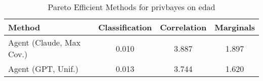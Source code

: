 \begin{table}[t!]
    \centering
    \caption{Pareto Efficient Methods for privbayes on edad}
    \label{tab:pareto_efficient_methods_privbayes_edad}
    \begin{tabular}{lccc}
    \toprule
    Method & Classification & Correlation & Marginals \\
    \midrule
    Agent (Claude, Max Cov.) & \cellcolor{gold!30}0.010 & \cellcolor{silver!30}3.887 & \cellcolor{silver!30}1.897 \\
    Agent (GPT, Unif.) & \cellcolor{silver!30}0.013 & \cellcolor{gold!30}3.744 & \cellcolor{gold!30}1.620 \\
    \bottomrule
    \end{tabular}
\end{table}